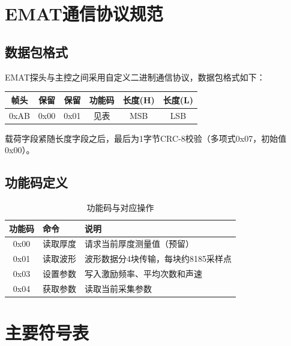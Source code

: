 \thesisappendix

\chapter{EMAT通信协议规范}

\section{数据包格式}

EMAT探头与主控之间采用自定义二进制通信协议，数据包格式如下：

\begin{center}
\begin{tabular}{|c|c|c|c|c|c|}
\hline
\textbf{帧头} & \textbf{保留} & \textbf{保留} & \textbf{功能码} & \textbf{长度(H)} & \textbf{长度(L)} \\
\hline
0xAB & 0x00 & 0x01 & 见表 & MSB & LSB \\
\hline
\end{tabular}
\end{center}

载荷字段紧随长度字段之后，最后为1字节CRC-8校验（多项式0x07，初始值0x00）。

\section{功能码定义}

\begin{table}[htbp]
\centering
\caption{功能码与对应操作}
\label{tab:func_codes}
\begin{tabular}{clp{6cm}}
\toprule
\textbf{功能码} & \textbf{命令} & \textbf{说明} \\
\midrule
0x00 & 读取厚度 & 请求当前厚度测量值（预留）\\
0x01 & 读取波形 & 波形数据分4块传输，每块约8185采样点\\
0x03 & 设置参数 & 写入激励频率、平均次数和声速\\
0x04 & 获取参数 & 读取当前采集参数\\
\bottomrule
\end{tabular}
\end{table}

\chapter{主要符号表}

